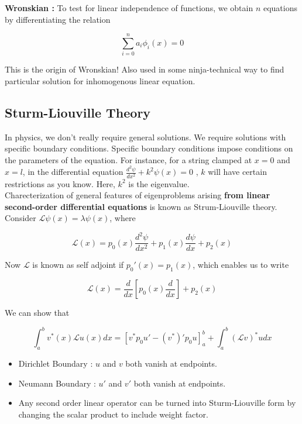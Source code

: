 \documentclass{report}
\begin{document}
\noindent \textbf{Wronskian :} To test for linear independence of functions, we obtain $n$ equations by differentiating the relation 

$$\sum_{i=0}^{n}a_i \phi_i (x) = 0$$

\noindent This is the origin of Wronskian! Also used in some ninja-technical way to find particular solution for inhomogenous linear equation.

\subsection{Sturm-Liouville Theory}

In physics, we don't really require general solutions. We require solutions with specific boundary conditions. Specific boundary conditions impose conditions on the parameters of the equation. For instance, for a string clamped at $x=0$ and $x=l$, in the differential equation $\frac{d^2\psi}{dx^2} + k^2\psi(x) = 0$ , $k$ will have certain restrictions as you know. Here, $k^2$ is the eigenvalue.\\

\noindent Charecterization of general features of eigenproblems arising \textbf{from linear second-order differential equations} is known as Strum-Liouville theory.\\

\noindent Consider $\mathcal{L}\psi(x) = \lambda\psi(x)$, where

$$\mathcal{L}(x) = p_0(x)\frac{d^2 \psi}{dx^2} + p_1(x)\frac{d\psi}{dx} + p_2(x)$$

\noindent Now $\mathcal{L}$ is known as self adjoint if $p_0'(x) = p_1(x)$, which enables us to write 

$$\mathcal{L}(x) = \frac{d}{dx}\left[p_0(x)\frac{d}{dx}\right]+p_2(x)$$

\noindent We can show that

$$\int_{a}^{b}v^*(x)\mathcal{L}u(x)dx = \left[v^* p_0 u' - (v^*)'p_0 u\right]_{a}^{b} + \int_{a}^{b}(\mathcal{L}v)^* u dx$$

\begin{itemize}
  \item Dirichlet Boundary : $u$ and $v$ both vanish at endpoints.
  \item Neumann Boundary : $u'$ and $v'$ both vanish at endpoints.
  \item Any second order linear operator can be turned into Sturm-Liouville form by changing the scalar product to include weight factor.
\end{itemize}
\end{document}
